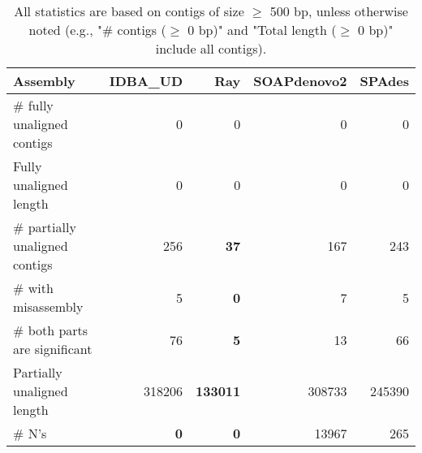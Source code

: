 \documentclass[12pt,a4paper]{article}
\begin{document}
\begin{table}[ht]
\begin{center}
\caption{All statistics are based on contigs of size $\geq$ 500 bp, unless otherwise noted (e.g., "\# contigs ($\geq$ 0 bp)" and "Total length ($\geq$ 0 bp)" include all contigs).}
\begin{tabular}{|l*{4}{|r}|}
\hline
Assembly & IDBA\_UD & Ray & SOAPdenovo2 & SPAdes \\ \hline
\# fully unaligned contigs & 0 & 0 & 0 & 0 \\ \hline
Fully unaligned length & 0 & 0 & 0 & 0 \\ \hline
\# partially unaligned contigs & 256 & {\bf 37} & 167 & 243 \\ \hline
\hspace{5mm}\# with misassembly & 5 & {\bf 0} & 7 & 5 \\ \hline
\hspace{5mm}\# both parts are significant & 76 & {\bf 5} & 13 & 66 \\ \hline
Partially unaligned length & 318206 & {\bf 133011} & 308733 & 245390 \\ \hline
\# N's & {\bf 0} & {\bf 0} & 13967 & 265 \\ \hline
\end{tabular}
\end{center}
\end{table}
\end{document}
